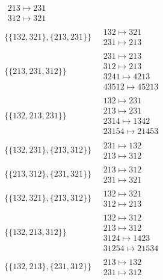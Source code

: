 \begin{scriptsize}
\begin{align}
\begin{matrix}
213 \mapsto 231
\\
312 \mapsto 321
\end{matrix}
\\
\{\{132, 321\}, \{213, 231\}\}
\ 
&
\begin{matrix}
132 \mapsto 321
\\
231 \mapsto 213
\end{matrix}
\\
\{\{213, 231, 312\}\}
\ 
&
\begin{matrix}
231 \mapsto 213
\\
312 \mapsto 213
\\
3241 \mapsto 4213
\\
43512 \mapsto 45213
\end{matrix}
\\
\{\{132, 213, 231\}\}
\ 
&
\begin{matrix}
132 \mapsto 231
\\
213 \mapsto 231
\\
2314 \mapsto 1342
\\
23154 \mapsto 21453
\end{matrix}
\\
\{\{132, 231\}, \{213, 312\}\}
\ 
&
\begin{matrix}
231 \mapsto 132
\\
213 \mapsto 312
\end{matrix}
\\
\{\{213, 312\}, \{231, 321\}\}
\ 
&
\begin{matrix}
213 \mapsto 312
\\
231 \mapsto 321
\end{matrix}
\\
\{\{132, 321\}, \{213, 312\}\}
\ 
&
\begin{matrix}
132 \mapsto 321
\\
312 \mapsto 213
\end{matrix}
\\
\{\{132, 213, 312\}\}
\ 
&
\begin{matrix}
132 \mapsto 312
\\
213 \mapsto 312
\\
3124 \mapsto 1423
\\
31254 \mapsto 21534
\end{matrix}
\\
\{\{132, 213\}, \{231, 312\}\}
\ 
&
\begin{matrix}
213 \mapsto 132
\\
231 \mapsto 312
\end{matrix}
\\

\end{align}
\end{scriptsize}
